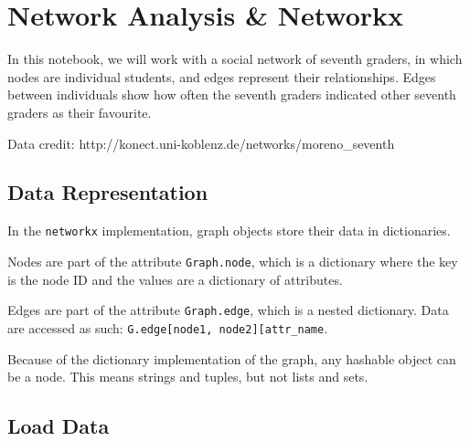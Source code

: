 \documentclass[11pt]{article}
\begin{document}
    \section{Network Analysis \& Networkx}\label{network-analysis-networkx}

    In this notebook, we will work with a social network of seventh graders,
in which nodes are individual students, and edges represent their
relationships. Edges between individuals show how often the seventh
graders indicated other seventh graders as their favourite.

Data credit: http://konect.uni-koblenz.de/networks/moreno\_seventh

    \subsection{Data Representation}\label{data-representation}

In the \texttt{networkx} implementation, graph objects store their data
in dictionaries.

Nodes are part of the attribute \texttt{Graph.node}, which is a
dictionary where the key is the node ID and the values are a dictionary
of attributes.

Edges are part of the attribute \texttt{Graph.edge}, which is a nested
dictionary. Data are accessed as such:
\texttt{G.edge{[}node1,\ node2{]}{[}\textquotesingle{}attr\_name\textquotesingle{}{]}}.

Because of the dictionary implementation of the graph, any hashable
object can be a node. This means strings and tuples, but not lists and
sets.

    \subsection{Load Data}\label{load-data}
\end{document}
